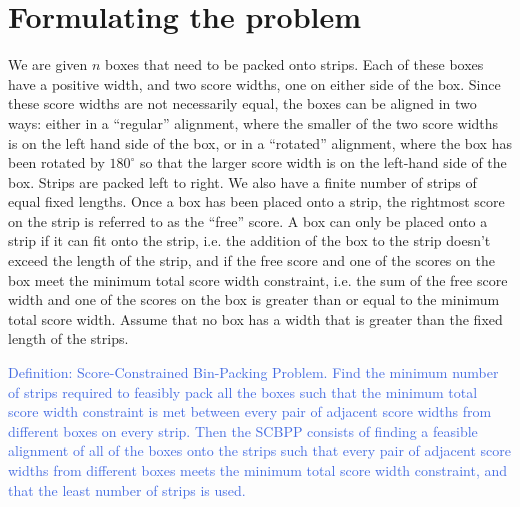 \documentclass[oribibl]{llncs}
\begin{document}
\section{Formulating the problem}
We are given $n$ boxes that need to be packed onto strips. Each of these boxes have a positive width, and two score widths, one on either side of the box. Since these score widths are not necessarily equal, the boxes can be aligned in two ways: either in a ``regular'' alignment, where the smaller of the two score widths is on the left hand side of the box, or in a ``rotated'' alignment, where the box has been rotated by $180^{\circ}$ so that the larger score width is on the left-hand side of the box. Strips are packed left to right. We also have a finite number of strips of equal fixed lengths. Once a box has been placed onto a strip, the rightmost score on the strip is referred to as the ``free'' score. A box can only be placed onto a strip if it can fit onto the strip, i.e. the addition of the box to the strip doesn't exceed the length of the strip, and if the free score and one of the scores on the box meet the minimum total score width constraint, i.e. the sum of the free score width and one of the scores on the box is greater than or equal to the minimum total score width. Assume that no box has a width that is greater than the fixed length of the strips.

\textcolor{RoyalBlue}{Definition: Score-Constrained Bin-Packing Problem. Find the minimum number of strips required to feasibly pack all the boxes such that the minimum total score width constraint is met between every pair of adjacent score widths from different boxes on every strip. Then the SCBPP consists of finding a feasible alignment of all of the boxes onto the strips such that every pair of adjacent score widths from different boxes meets the minimum total score width constraint, and that the least number of strips is used.}
\end{document}
